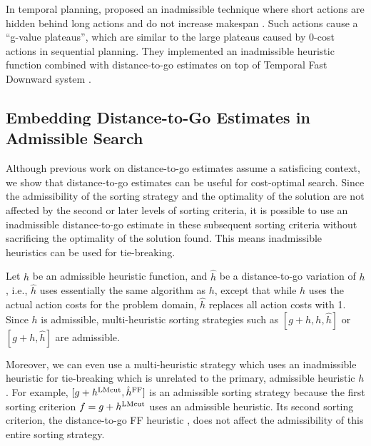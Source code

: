 In temporal planning,  proposed an inadmissible technique where short actions are
hidden behind long actions and do not increase makespan \cite{benton2010g}. Such actions cause a ``g-value
plateaus'', which are similar to the large plateaus caused by 0-cost actions in sequential planning.  They implemented an inadmissible
heuristic function combined with distance-to-go estimates on top of Temporal Fast Downward system
\cite{eyerich2009using}.  %


\subsection{Embedding Distance-to-Go Estimates in Admissible Search}

Although previous work on distance-to-go estimates assume a satisficing context,
we show that distance-to-go estimates can be useful for cost-optimal search.
Since the admissibility of the sorting strategy and the optimality of the solution are not affected by the
second or later levels of sorting criteria, it is possible to use an inadmissible distance-to-go estimate
in these subsequent sorting criteria without sacrificing the optimality of the solution found.
This means inadmissible heuristics can be used for tie-breaking.


Let $h$ be an admissible heuristic function, and
$\hat{h}$ be a distance-to-go variation of $h$, i.e., $\hat{h}$ uses essentially the same algorithm as $h$, except that while $h$ uses the actual action costs for the problem domain, $\hat{h}$ replaces all action costs with 1.
Since $h$ is admissible, multi-heuristic sorting strategies such as $[g+h,h,\hat{h}]$ or $[g+h,\hat{h}]$
are admissible.

Moreover, we can even use a multi-heuristic strategy which uses an inadmissible heuristic for tie-breaking which is unrelated to the primary, admissible heuristic $h$.
 For example, $[g+h^{\text{LMcut}},\hat{h}^{\text{FF}}]$ is an admissible sorting strategy
because the first sorting criterion $f=g+h^{\text{LMcut}}$ uses an admissible
\lmcut heuristic. Its second sorting criterion, the distance-to-go FF
heuristic \cite{Hoffmann01}, does not affect the admissibility of this entire sorting strategy.

